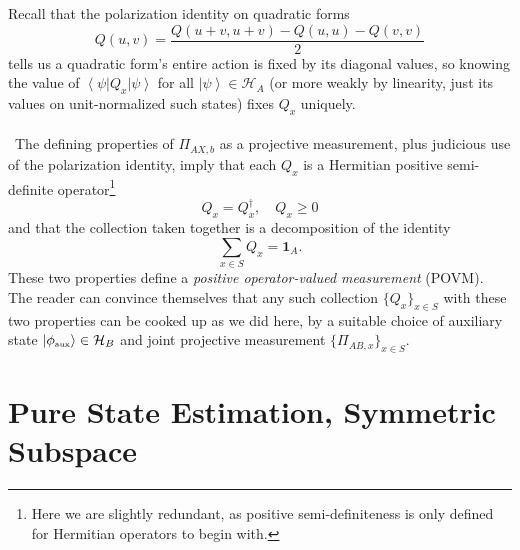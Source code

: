 \documentclass[11pt,letterpaper]{article}
\newcommand{\mc}[1]{\mathcal{#1}}
\newcommand{\KET}[1]{\left| #1 \right\rangle }
\newcommand{\BRA}[1]{\left\langle #1 \right| }
\begin{document}
Recall that the polarization identity on quadratic forms \begin{equation}
Q(u, v) = \frac{Q(u+v, u+v) - Q(u,u) - Q(v,v)}{2}
\end{equation}
tells us a quadratic form's entire action is fixed by its diagonal values, so knowing the value of $\BRA{\psi} Q_x \KET{\psi}$ for all $\KET{\psi} \in \mc{H}_A$ (or more weakly by linearity, just its values on unit-normalized such states) fixes $Q_x$ uniquely.\\
\\
\
The defining properties of $\Pi_{AX,b}$ as a projective measurement, plus judicious use of the polarization identity, imply that each $Q_x$ is a Hermitian positive semi-definite operator\footnote{Here we are slightly redundant, as positive semi-definiteness is only defined for Hermitian operators to begin with.} \begin{equation}
Q_x = Q_x^\dagger, \quad Q_x \geq 0
\end{equation}
and that the collection taken together is a decomposition of the identity \begin{equation}
\sum_{x \in S} Q_x = \mathbf{1}_A.
\end{equation}
These two properties define a \textit{positive operator-valued measurement} (POVM). The reader can convince themselves that any such collection $\{Q_x\}_{x \in S}$ with these two properties can be cooked up as we did here, by a suitable choice of auxiliary state $\KET{\phi_{\mbox{\tiny{aux}}}} \in \mc{H}_B$ and joint projective measurement $\{\Pi_{AB,x} \}_{x \in S}$.


\section{Pure State Estimation, Symmetric Subspace}
\end{document}
